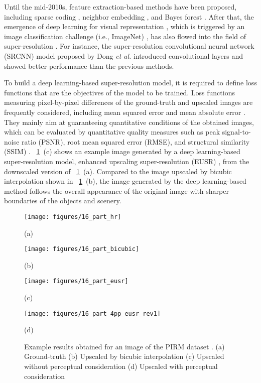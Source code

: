 \documentclass[runningheads]{llncs}
\begin{document}
Until the mid-2010s, feature extraction-based methods have been proposed, including sparse coding \cite{yang2011multitask}, neighbor embedding \cite{li2014single}, and Bayes forest \cite{salvador2015naive}.
After that, the emergence of deep learning for visual representation \cite{guo2016deep}, which is triggered by an image classification challenge (i.e., ImageNet) \cite{krizhevsky2012imagenet}, has also flowed into the field of super-resolution \cite{yang2018deep}.
For instance, the super-resolution convolutional neural network (SRCNN) model proposed by Dong \textit{et al.} \cite{dong2014learning} introduced convolutional layers and showed better performance than the previous methods.

To build a deep learning-based super-resolution model, it is required to define loss functions that are the objectives of the model to be trained.
Loss functions measuring pixel-by-pixel differences of the ground-truth and upscaled images are frequently considered, including mean squared error and mean absolute error \cite{yang2018deep}.
They mainly aim at guaranteeing quantitative conditions of the obtained images, which can be evaluated by quantitative quality measures such as peak signal-to-noise ratio (PSNR), root mean squared error (RMSE), and structural similarity (SSIM) \cite{wang2004image}.
\figurename~\ref{fig:example_result}~(c) shows an example image generated by a deep learning-based super-resolution model, enhanced upscaling super-resolution (EUSR) \cite{kim2018deep}, from the downscaled version of \figurename~\ref{fig:example_result}~(a).
Compared to the image upscaled by bicubic interpolation shown in \figurename~\ref{fig:example_result}~(b), the image generated by the deep learning-based method follows the overall appearance of the original image with sharper boundaries of the objects and scenery.

\begin{figure}[t]
	\centering
	\begin{minipage}[b]{0.24\linewidth}
		\centering
		\centerline{\texttt{[image: figures/16\_part\_hr]}}
		\centerline{(a)}
	\end{minipage}
	\begin{minipage}[b]{0.24\linewidth}
		\centering
		\centerline{\texttt{[image: figures/16\_part\_bicubic]}}
		\centerline{(b)}
	\end{minipage}
	\begin{minipage}[b]{0.24\linewidth}
		\centering
		\centerline{\texttt{[image: figures/16\_part\_eusr]}}
		\centerline{(c)}
	\end{minipage}
	\begin{minipage}[b]{0.24\linewidth}
		\centering
		\centerline{\texttt{[image: figures/16\_part\_4pp\_eusr\_rev1]}}
		\centerline{(d)}
	\end{minipage}
	\caption{Example results obtained for an image of the PIRM dataset \cite{blau20182018}. (a) Ground-truth (b) Upscaled by bicubic interpolation (c) Upscaled without perceptual consideration (d) Upscaled with perceptual consideration}
	\label{fig:example_result}
\end{figure}
\end{document}
